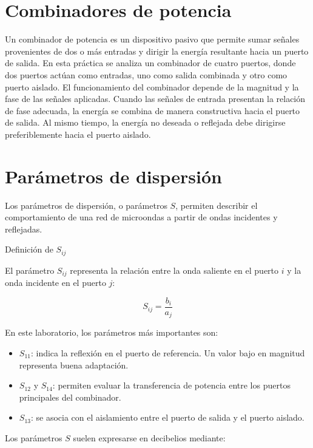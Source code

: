 \section{Combinadores de potencia}

Un combinador de potencia es un dispositivo pasivo que permite sumar señales provenientes de dos o más entradas y dirigir la energía resultante hacia un puerto de salida. En esta práctica se analiza un combinador de cuatro puertos, donde dos puertos actúan como entradas, uno como salida combinada y otro como puerto aislado. El funcionamiento del combinador depende de la magnitud y la fase de las señales aplicadas. Cuando las señales de entrada presentan la relación de fase adecuada, la energía se combina de manera constructiva hacia el puerto de salida. Al mismo tiempo, la energía no deseada o reflejada debe dirigirse preferiblemente hacia el puerto aislado.

\section{Parámetros de dispersión}

Los parámetros de dispersión, o parámetros $S$, permiten describir el comportamiento de una red de microondas a partir de ondas incidentes y reflejadas. 
\begin{conceptcard}{Definición de $S_{ij}$}

El parámetro $S_{ij}$ representa la relación entre la onda saliente en el puerto $i$ y la onda incidente en el puerto $j$:

\begin{equation}
S_{ij}=\frac{b_i}{a_j}
\end{equation}

\end{conceptcard}

En este laboratorio, los parámetros más importantes son:

\begin{itemize}
\item $S_{11}$: indica la reflexión en el puerto de referencia. Un valor bajo en magnitud representa buena adaptación.
\item $S_{12}$ y $S_{14}$: permiten evaluar la transferencia de potencia entre los puertos principales del combinador.
\item $S_{13}$: se asocia con el aislamiento entre el puerto de salida y el puerto aislado.
\end{itemize}

Los parámetros $S$ suelen expresarse en decibelios mediante:

